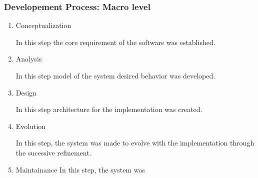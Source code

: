 \documentclass[a4paper,12pt,onepage]{article}
\begin{document}
\subsubsection{Developement Process: Macro level}
\begin{enumerate}
\item Conceptualization
\par
In this step the core requirement of the software was established.
\newpage
\item Analysis
\par
In this step model of the system desired behavior was developed.
\newpage
\item Design
\par
In this step architecture for the implementation was created.
\newpage
\item Evolution
\par
In this step, the system was made to evolve with the implementation through
the sucessive refinement.
\newpage
\item Maintainance
In this step, the system was 
\newpage
\end{enumerate}
\end{document}
